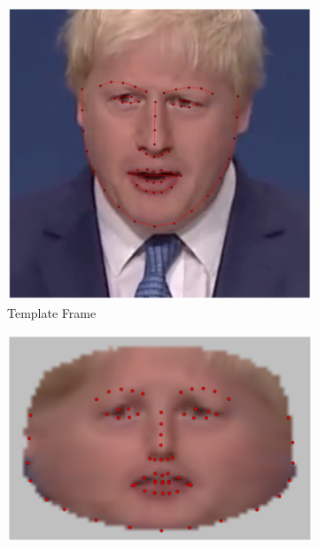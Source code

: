 \begin{figure}
    \centering
    \hspace*{\fill}
    \begin{subfigure}[b]{0.163\textwidth}
        \centering
        \includegraphics[width=\textwidth]{face_flow/images/boris/boris_template}
        \caption*{Template Frame}
    \end{subfigure}  \hfill
    \begin{subfigure}[b]{0.23\textwidth}
        \centering
        \includegraphics[width=\textwidth]{face_flow/images/boris/boris_sampled_template_05}

\end{subfigure}
\end{figure}
